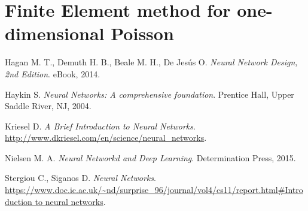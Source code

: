 \documentclass[11pt, a4paper]{report}
\theoremstyle{theorem}
\numberwithin{equation}{section}
\numberwithin{figure}{section}
\begin{document}
	\section{Finite Element method for one-dimensional Poisson}
	\label{section:Finite Element method for one-dimensional Poisson}
		
		
	\begin{thebibliography}{50}
	
		Hagan M. T., Demuth H. B., Beale M. H., De Jes\'us O. \emph{Neural Network Design, 2nd Edition}. eBook, 2014.
		
		Haykin S. \emph{Neural Networks: A comprehensive foundation}. Prentice Hall, Upper Saddle River, NJ, 2004.
		
		Kriesel D. \emph{A Brief Introduction to Neural Networks}. \url{http://www.dkriesel.com/en/science/neural_networks}.
		
		Nielsen M. A. \emph{Neural Networkd and Deep Learning}. Determination Press, 2015.
		
		Stergiou C., Siganos D. \emph{Neural Networks}. \url{https://www.doc.ic.ac.uk/~nd/surprise_96/journal/vol4/cs11/report.html#Introduction to neural networks}.
		
	\end{thebibliography}	
	
\end{document}
